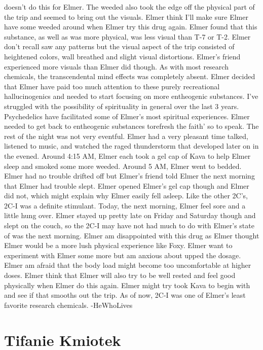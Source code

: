 \documentclass[12pt]{book}
\begin{document}
doesn't do this for Elmer. The weeded also took the edge off the physical part of the trip and seemed to bring out the visuals. Elmer think I'll make sure Elmer have some weeded around when Elmer try this drug again. Elmer found that this substance, as well as was more physical, was less visual than T-7 or T-2. Elmer don't recall saw any patterns but the visual aspect of the trip consisted of heightened colors, wall breathed and slight visual distortions. Elmer's friend experienced more visuals than Elmer did though. As with most research chemicals, the transcendental mind effects was completely absent. Elmer decided that Elmer have paid too much attention to these purely recreational hallucinogenics and needed to start focusing on more entheogenic substances. I've struggled with the possibility of spirituality in general over the last 3 years. Psychedelics have facilitated some of Elmer's most spiritual experiences. Elmer needed to get back to entheogenic substances torefresh the faith' so to speak. The rest of the night was not very eventful. Elmer had a very pleasant time talked, listened to music, and watched the raged thunderstorm that developed later on in the evened. Around 4:15 AM, Elmer each took a gel cap of Kava to help Elmer sleep and smoked some more weeded. Around 5 AM, Elmer went to bedded. Elmer had no trouble drifted off but Elmer's friend told Elmer the next morning that Elmer had trouble slept. Elmer opened Elmer's gel cap though and Elmer did not, which might explain why Elmer easily fell asleep. Like the other 2C's, 2C-I was a definite stimulant. Today, the next morning, Elmer feel sore and a little hung over. Elmer stayed up pretty late on Friday and Saturday though and slept on the couch, so the 2C-I may have not had much to do with Elmer's state of was the next morning. Elmer am disappointed with this drug as Elmer thought Elmer would be a more lush physical experience like Foxy. Elmer want to experiment with Elmer some more but am anxious about upped the dosage. Elmer am afraid that the body load might become too uncomfortable at higher doses. Elmer think that Elmer will also try to be well rested and feel good physically when Elmer do this again. Elmer might try took Kava to begin with and see if that smooths out the trip. As of now, 2C-I was one of Elmer's least favorite research chemicals. -HeWhoLives



\chapter{Tifanie Kmiotek}
\end{document}
